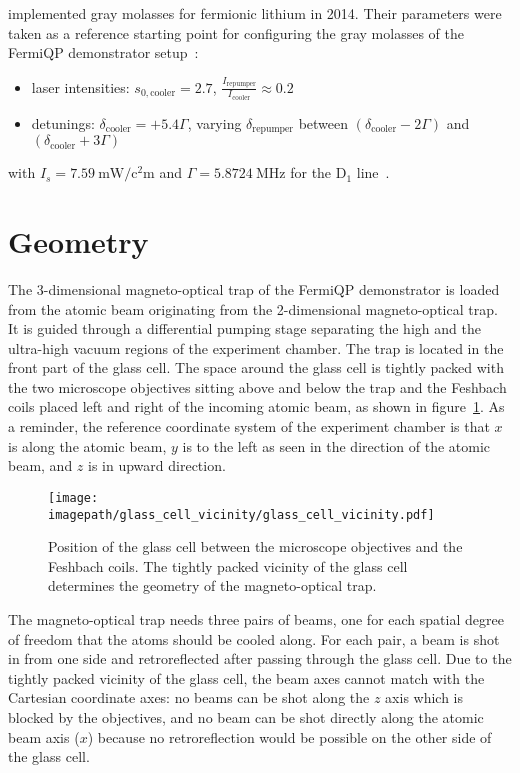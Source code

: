 \citeauthor{burchianti_efficient_2014} implemented gray molasses for fermionic lithium in 2014. Their parameters were taken as a reference starting point for configuring the gray molasses of the FermiQP demonstrator setup~\cite{burchianti_efficient_2014}:
\begin{itemize}
    \item laser intensities: $s_{0, \text{cooler}} = 2.7$, $\frac{I_\text{repumper}}{I_\text{cooler}} \approx 0.2$
    \item detunings: $\delta_\text{cooler} = +5.4 \Gamma$, varying $\delta_\text{repumper}$ between $(\delta_\text{cooler} -2 \Gamma)$ and  $(\delta_\text{cooler}+ 3\Gamma)$
\end{itemize}
with $I_s = \SI{7.59}{\milli\watt\per\square\centi\meter}$ and $\Gamma = \SI{5.8724}{\mega\hertz}$ for the D$_1$ line~\cite{gehm_properties_2003}.


\section{Geometry}
The 3-dimensional magneto-optical trap of the FermiQP demonstrator is loaded from the atomic beam originating from the 2-dimensional magneto-optical trap. It is guided through a differential pumping stage separating the high and the ultra-high vacuum regions of the experiment chamber. The trap is located in the front part of the glass cell. The space around the glass cell is tightly packed with the two microscope objectives sitting above and below the trap and the Feshbach coils placed left and right of the incoming atomic beam, as shown in figure~\ref{fig:glass_cell_vicinity}. As a reminder, the reference coordinate system of the experiment chamber is that $x$ is along the atomic beam, $y$ is to the left as seen in the direction of the atomic beam, and $z$ is in upward direction.

\begin{figure}
    \centering
    \texttt{[image: \\imagepath/glass\_cell\_vicinity/glass\_cell\_vicinity.pdf]}
    \caption{Position of the glass cell between the microscope objectives and the Feshbach coils. The tightly packed vicinity of the glass cell determines the geometry of the magneto-optical trap.}\label{fig:glass_cell_vicinity}
\end{figure}

The magneto-optical trap needs three pairs of beams, one for each spatial degree of freedom that the atoms should be cooled along. For each pair, a beam is shot in from one side and retroreflected after passing through the glass cell. Due to the tightly packed vicinity of the glass cell, the beam axes cannot match with the Cartesian coordinate axes: no beams can be shot along the $z$ axis which is blocked by the objectives, and no beam can be shot directly along the atomic beam axis ($x$) because no retroreflection would be possible on the other side of the glass cell.

